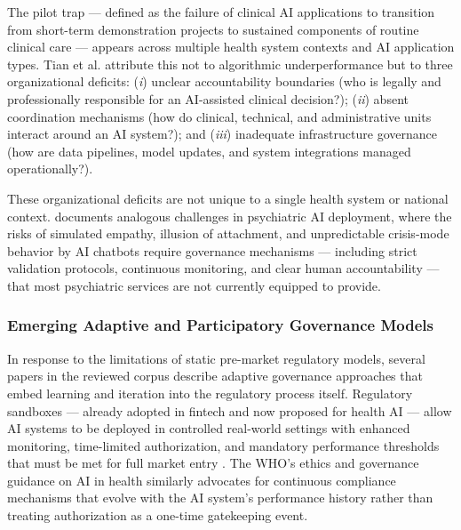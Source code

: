 The pilot trap — defined as the failure of clinical AI applications to
transition from short-term demonstration projects to sustained components
of routine clinical care — appears across multiple health system contexts
and AI application types. Tian et al. \citep{tian2026pilottrap} attribute
this not to algorithmic underperformance but to three organizational
deficits: (\textit{i}) unclear accountability boundaries (who is legally
and professionally responsible for an AI-assisted clinical decision?);
(\textit{ii}) absent coordination mechanisms (how do clinical, technical,
and administrative units interact around an AI system?); and
(\textit{iii}) inadequate infrastructure governance (how are data pipelines,
model updates, and system integrations managed operationally?).

These organizational deficits are not unique to a single health system or
national context. \citet{keri2026simulated} documents analogous challenges
in psychiatric AI deployment, where the risks of simulated empathy, illusion
of attachment, and unpredictable crisis-mode behavior by AI chatbots require
governance mechanisms — including strict validation protocols, continuous
monitoring, and clear human accountability — that most psychiatric services
are not currently equipped to provide.


\subsubsection{Emerging Adaptive and Participatory Governance Models}
\label{sec:gov_adaptive}

In response to the limitations of static pre-market regulatory models,
several papers in the reviewed corpus describe adaptive governance
approaches that embed learning and iteration into the regulatory process
itself. Regulatory sandboxes — already adopted in fintech and now proposed
for health AI — allow AI systems to be deployed in controlled real-world
settings with enhanced monitoring, time-limited authorization, and
mandatory performance thresholds that must be met for full market entry
\citep{pham2025ethical, abdul2025ai}. The WHO's ethics and governance
guidance on AI in health similarly advocates for continuous compliance
mechanisms that evolve with the AI system's performance history rather
than treating authorization as a one-time gatekeeping event.

